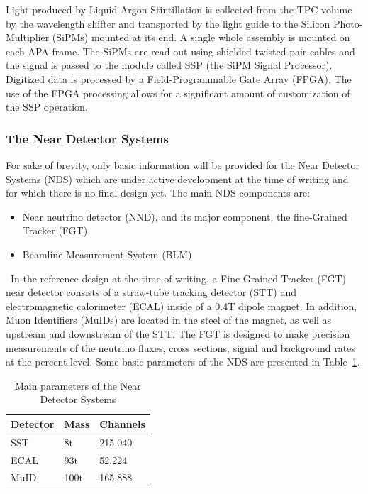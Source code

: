 Light produced by Liquid Argon Stintillation is collected from the TPC volume by the wavelength shifter and transported
by the light guide to the Silicon Photo-Multiplier (SiPMs) mounted at its end. A single whole assembly is mounted on each  APA frame.
The SiPMs are read out using shielded twisted-pair cables and the signal is passed to the module called SSP (the SiPM Signal
Processor). Digitized data is processed by a  Field-Programmable Gate Array (FPGA). The use
of the FPGA processing allows for a significant amount of customization of the SSP operation.


\subsubsection{The Near Detector Systems}
\label{sec:nds-params}
For sake of brevity, only basic information will be provided for the Near Detector Systems (NDS) which are under active development
at the time of writing and for which there is no final design yet. The main NDS components are:
\begin{itemize}
\item Near neutrino detector (NND), and its major component, the fine-Grained Tracker (FGT)
\item Beamline Measurement System (BLM)
\end{itemize}
\ 
In the reference design at the time of writing, a Fine-Grained Tracker (FGT) near detector consists of a straw-tube
tracking detector (STT) and electromagnetic calorimeter (ECAL) inside of a 0.4T dipole magnet.
In addition, Muon Identifiers (MuIDs) are located in the steel of the magnet, as well as upstream
and downstream of the STT. The FGT is designed to make precision measurements of the neutrino
fluxes, cross sections, signal and background rates at the percent level. Some basic parameters of the
NDS are presented in Table~\ref{tab:nds-params}.
\begin{table}[ht!]
\centering
\begin{tabular}{| p{1in} | p{1in} | p{1in} |}		\hline		
\textbf{Detector} & \textbf{Mass} & \textbf{Channels} \\ \hline
SST & 8t & 215,040 \\ \hline
ECAL & 93t & 52,224 \\ \hline
MuID & 100t & 165,888 \\ \hline
\end{tabular}
\caption{Main parameters of the Near Detector Systems}
\label{tab:nds-params}
\end{table}

